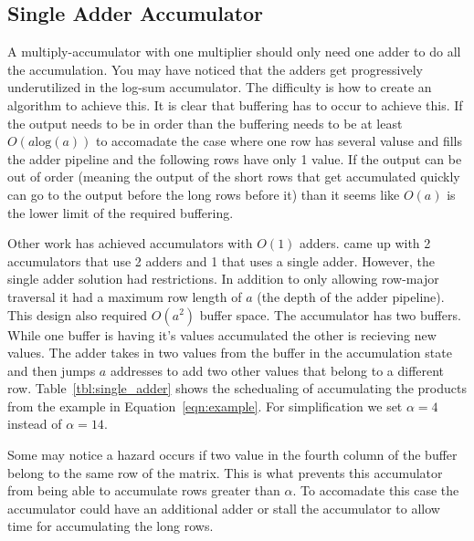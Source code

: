 \subsection{Single Adder Accumulator}
A multiply-accumulator with one multiplier should only need one adder to do all the accumulation. You may have noticed that the adders get progressively underutilized in the log-sum accumulator. The difficulty is how to create an algorithm to achieve this. It is clear that buffering has to occur to achieve this. If the output needs to be in order than the buffering needs to be at least $O(a\textrm{log}(a))$ to accomadate the case where one row has several valuse and fills the adder pipeline and the following rows have only 1 value. If the output can be out of order (meaning the output of the short rows that get accumulated quickly can go to the output before the long rows before it) than it seems like $O(a)$ is the lower limit of the required buffering.

Other work has achieved accumulators with $O(1)$ adders. \cite{prelim:zhuo} came up with 2 accumulators that use 2 adders and 1 that uses a single adder. However, the single adder solution had restrictions. In addition to only allowing row-major traversal it had a maximum row length of $a$ (the depth of the adder pipeline). This design also required $O(a^2)$ buffer space. The accumulator has two buffers. While one buffer is having it's values accumulated the other is recieving new values. The adder takes in two values from the buffer in the accumulation state and then jumps $a$ addresses to add two other values that belong to a different row. Table~\ref{tbl:single_adder} shows the schedualing of accumulating the products from the example in Equation~\ref{eqn:example}. For simplification we set $\alpha = 4$ instead of $\alpha = 14$.

Some may notice a hazard occurs if two value in the fourth column of the buffer belong to the same row of the matrix. This is what prevents this accumulator from being able to accumulate rows greater than $\alpha$. To accomadate this case the accumulator could have an additional adder or stall the accumulator to allow time for accumulating the long rows.

